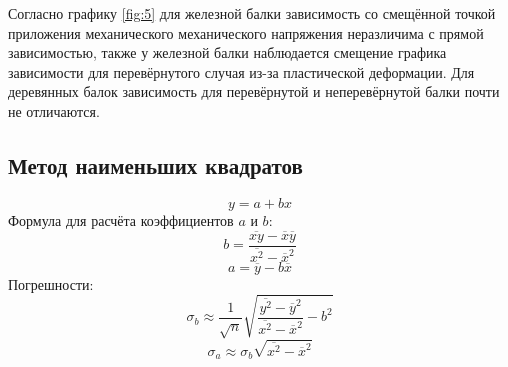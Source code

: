 \documentclass[12pt]{article}
\begin{document}
Согласно графику \ref{fig:5} для железной балки зависимость со смещённой точкой приложения механического механического напряжения неразличима с прямой зависимостью, также у 
железной балки наблюдается смещение графика зависимости для перевёрнутого случая из-за пластической деформации. Для деревянных балок 
зависимость для перевёрнутой и неперевёрнутой балки почти не отличаются. 

\subsection{Метод наименьших квадратов} \label{app_4}
$$y = a + bx$$
Формула для расчёта коэффициентов $a$ и $b$:
$$b = \frac{\overline{xy} - \overline{x}\overline{y}}{\overline{x^2} - \overline{x}^2}$$
$$a = \overline{y} - b\overline{x}$$
Погрешности:
$$\sigma_b \approx \frac{1}{\sqrt{n}}\sqrt{\frac{\overline{y^2} - \overline{y}^2}{\overline{x^2} - \overline{x}^2} - b^2}$$
$$\sigma_a \approx \sigma_b \sqrt{\overline{x^2} - \overline{x}^2}$$
\end{document}
